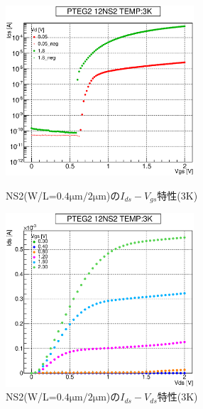 				\begin{figure}[htbp]
					\begin{minipage}{0.5\hsize}
						\begin{center}
							\includegraphics[width=70mm]{./Chapter/Appendix/Picture/NST/NS2/PTEG2_12_NS2_IdVg_3K.eps}
						\end{center}
						\caption{NS2(W/L=$0.4\mathrm{\mu m}/2\mathrm{\mu m}$)の$I_{ds}-V_{gs}$特性(3K)}
						\label{fig:NS2_IdVg_3K}
					\end{minipage}
					\begin{minipage}{0.5\hsize}
						\begin{center}
							\includegraphics[width=70mm]{./Chapter/Appendix/Picture/NST/NS2/PTEG2_12_NS2_IdVd_3K.eps}
						\end{center}
						\caption{NS2(W/L=$0.4\mathrm{\mu m}/2\mathrm{\mu m}$)の$I_{ds}-V_{ds}$特性(3K)}
						\label{fig:NS2_IdVd_3K}
					\end{minipage}
				\end{figure}
